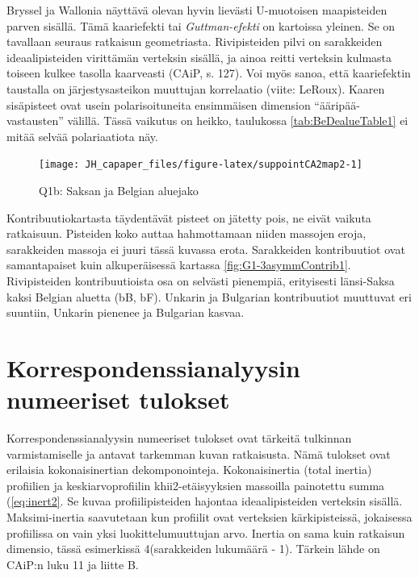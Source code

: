 \documentclass[
  finnish,
]{book}
\begin{document}
Bryssel ja Wallonia näyttävä olevan hyvin lievästi U-muotoisen maapisteiden
parven sisällä. Tämä kaariefekti tai \emph{Guttman-efekti} on kartoissa yleinen.
Se on tavallaan seuraus ratkaisun geometriasta. Rivipisteiden pilvi on
sarakkeiden ideaalipisteiden virittämän verteksin sisällä, ja ainoa reitti
verteksin kulmasta toiseen kulkee tasolla kaarveasti (CAiP, s. 127).
Voi myös sanoa, että kaariefektin taustalla on järjestysasteikon muuttujan
korrelaatio (viite: LeRoux). Kaaren sisäpisteet ovat usein polarisoituneita
ensimmäisen dimension ``ääripää-vastausten'' välillä. Tässä vaikutus on heikko,
taulukossa \ref{tab:BeDealueTable1} ei mitää selvää polariaatiota näy.

\begin{figure}

{\centering \texttt{[image: JH\_capaper\_files/figure-latex/suppointCA2map2-1]} 

}

\caption{Q1b: Saksan ja  Belgian aluejako }\label{fig:suppointCA2map2}
\end{figure}

Kontribuutiokartasta täydentävät pisteet on jätetty pois, ne eivät vaikuta ratkaisuun.
Pisteiden koko auttaa hahmottamaan niiden massojen eroja, sarakkeiden massoja ei
juuri tässä kuvassa erota. Sarakkeiden kontribuutiot ovat samantapaiset kuin
alkuperäisessä kartassa \ref{fig:G1-3asymmContrib1}. Rivipisteiden kontribuutioista
osa on selvästi pienempiä, erityisesti länsi-Saksa kaksi Belgian aluetta (bB, bF).
Unkarin ja Bulgarian kontribuutiot muuttuvat eri suuntiin, Unkarin pienenee ja
Bulgarian kasvaa.

\hypertarget{korrespondenssianalyysin-numeeriset-tulokset}{%
\section{Korrespondenssianalyysin numeeriset tulokset}\label{korrespondenssianalyysin-numeeriset-tulokset}}

Korrespondenssianalyysin numeeriset tulokset ovat tärkeitä tulkinnan varmistamiselle
ja antavat tarkemman kuvan ratkaisusta. Nämä tulokset ovat erilaisia kokonaisinertian
dekomponointeja. Kokonaisinertia (total inertia) profiilien ja keskiarvoprofiilin
khii2-etäisyyksien massoilla painotettu summa (\eqref{eq:inert2}. Se kuvaa
profiilipisteiden hajontaa ideaalipisteiden verteksin sisällä. Maksimi-inertia
saavutetaan kun profiilit ovat verteksien kärkipisteissä, jokaisessa profiilissa
on vain yksi luokittelumuuttujan arvo. Inertia on sama kuin ratkaisun dimensio,
tässä esimerkissä 4(sarakkeiden lukumäärä - 1). Tärkein lähde on CAiP:n luku 11
ja liitte B.
\end{document}
